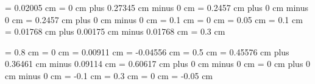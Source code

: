 \gre@maximumspacewithoutdash = 0.02005 cm
\gre@afterclefnospace = 0 cm plus 0.27345 cm minus 0 cm
\gre@afterinitialshift = 0.2457 cm plus 0 cm minus 0 cm
\gre@beforeinitialshift = 0.2457 cm plus 0 cm minus 0 cm
\gre@minimalspaceatlinebeginning = 0.1 cm
\gre@manualinitialwidth = 0 cm
\gre@aboveinitialseparation = 0.05 cm
\gre@noclefspace = 0.1 cm
\gre@clefchangespace = 0.01768 cm plus 0.00175 cm minus 0.01768 cm%
\gre@clivisalignmentmin = 0.3 cm




\gre@abovesignsspace = 0.8 cm
\gre@belowsignsspace = 0 cm
\gre@lowchoralsignshift = 0.00911 cm
\gre@highchoralsignshift = -0.04556 cm
\gre@translationheight = 0.5 cm
\gre@spaceabovelines = 0.45576 cm plus 0.36461 cm minus 0.09114 cm
\gre@spacelinestext = 0.60617 cm plus 0 cm minus 0 cm
\gre@spacebeneathtext = 0 cm plus 0 cm minus 0 cm
\gre@abovelinestextraise = -0.1 cm%
\gre@abovelinestextheight = 0.3 cm%
\gre@braceshift = 0 cm
\gre@curlybraceaccentusshift = -0.05 cm

\makeatother
